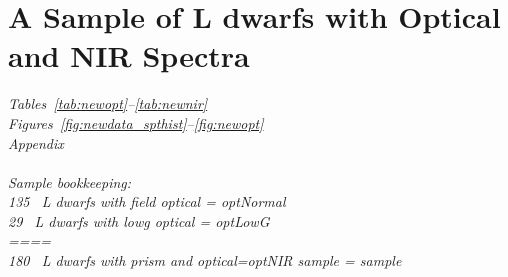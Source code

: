 \documentclass[12pt,preprint]{aastex}
\newcommand{\sample}{180}
\newcommand{\optNormal}{135}
\newcommand{\optLowG}{29}
\newcommand{\optNoisy}{13}
\newcommand{\optPec}{35}
\begin{document}
% 

\clearpage
\section{A Sample of L dwarfs with Optical and NIR Spectra}
\label{sec:sample}

\emph{
Tables~\ref{tab:newopt}--\ref{tab:newnir}\\
Figures~\ref{fig:newdata_spthist}--\ref{fig:newopt}\\
Appendix\\
\\
Sample bookkeeping:\\
\optNormal~ L dwarfs with field optical =  \emph{optNormal}\\
\optLowG~ L dwarfs with lowg optical = \emph{optLowG} \\
====\\
\sample~ L dwarfs with prism and optical=optNIR sample = \emph{sample}\\
}
\end{document}
